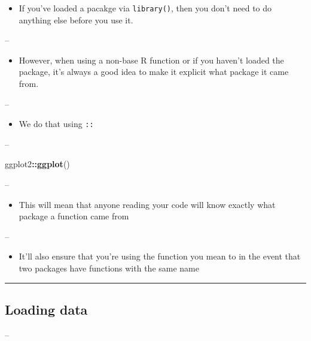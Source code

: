 \documentclass[]{article}
\newenvironment{Shaded}{\begin{snugshade}}{\end{snugshade}}
\newcommand{\KeywordTok}[1]{\textcolor[rgb]{0.13,0.29,0.53}{\textbf{#1}}}
\newcommand{\NormalTok}[1]{#1}
\newcommand{\OperatorTok}[1]{\textcolor[rgb]{0.81,0.36,0.00}{\textbf{#1}}}
\providecommand{\tightlist}{%
  \setlength{\itemsep}{0pt}\setlength{\parskip}{0pt}}
\begin{document}
\begin{itemize}
\tightlist
\item
  If you've loaded a pacakge via \texttt{library()}, then you don't need
  to do anything else before you use it.
\end{itemize}

--

\begin{itemize}
\tightlist
\item
  However, when using a non-base R function or if you haven't loaded the
  package, it's always a good idea to make it explicit what package it
  came from.
\end{itemize}

--

\begin{itemize}
\tightlist
\item
  We do that using \texttt{::}
\end{itemize}

--

\begin{Shaded}
\begin{Highlighting}[]
\NormalTok{ggplot2}\OperatorTok{::}\KeywordTok{ggplot}\NormalTok{()}
\end{Highlighting}
\end{Shaded}

--

\begin{itemize}
\tightlist
\item
  This will mean that anyone reading your code will know exactly what
  package a function came from
\end{itemize}

--

\begin{itemize}
\tightlist
\item
  It'll also ensure that you're using the function you mean to in the
  event that two packages have functions with the same name
\end{itemize}

\begin{center}\rule{0.5\linewidth}{\linethickness}\end{center}

\hypertarget{loading-data}{%
\subsection{Loading data}\label{loading-data}}

--
\end{document}
